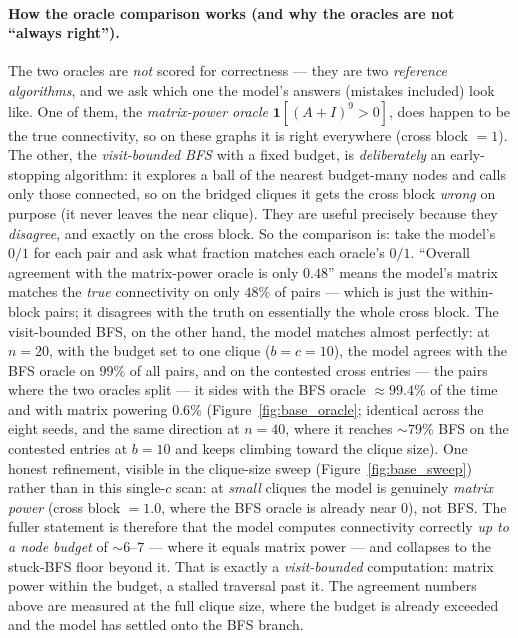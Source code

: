 \documentclass[11pt,a4paper]{article}
\begin{document}
\paragraph{How the oracle comparison works (and why the oracles are not ``always right'').} The two
oracles are \emph{not} scored for correctness --- they are two \emph{reference algorithms}, and we
ask which one the model's answers (mistakes included) look like. One of them, the \emph{matrix-power
oracle} $\mathbf 1[(A+I)^{9}>0]$, does happen to be the true connectivity, so on these graphs it is
right everywhere (cross block $=1$). The other, the \emph{visit-bounded BFS} with a fixed budget, is
\emph{deliberately} an early-stopping algorithm: it explores a ball of the nearest budget-many nodes
and calls only those connected, so on the bridged cliques it gets the cross block \emph{wrong} on
purpose (it never leaves the near clique). They are useful precisely because they \emph{disagree},
and exactly on the cross block. So the comparison is: take the model's $0/1$ for each pair and ask
what fraction matches each oracle's $0/1$. ``Overall agreement with the matrix-power oracle is only
$0.48$'' means the model's matrix matches the \emph{true} connectivity on only $48\%$ of pairs ---
which is just the within-block pairs; it disagrees with the truth on essentially the whole cross
block. The visit-bounded BFS, on the other hand, the model matches almost perfectly: at $n=20$,
with the budget set to one clique ($b=c=10$), the model agrees with the BFS oracle on $99\%$ of all
pairs, and on the contested cross entries --- the pairs where the two oracles split --- it sides
with the BFS oracle $\approx 99.4\%$ of the time and with matrix powering $0.6\%$
(Figure~\ref{fig:base_oracle}; identical across the eight seeds, and the same direction at $n=40$,
where it reaches $\sim\!79\%$ BFS on the contested entries at $b=10$ and keeps climbing toward the
clique size). One honest refinement, visible in the clique-size sweep
(Figure~\ref{fig:base_sweep}) rather than in this single-$c$ scan: at \emph{small} cliques the
model is genuinely \emph{matrix power} (cross block $=1.0$, where the BFS oracle is already near
$0$), not BFS. The fuller statement is therefore that the model computes connectivity correctly
\emph{up to a node budget} of $\sim6$--$7$ --- where it equals matrix power --- and collapses to the
stuck-BFS floor beyond it. That is exactly a \emph{visit-bounded} computation: matrix power within
the budget, a stalled traversal past it. The agreement numbers above are measured at the full
clique size, where the budget is already exceeded and the model has settled onto the BFS branch.
\end{document}
